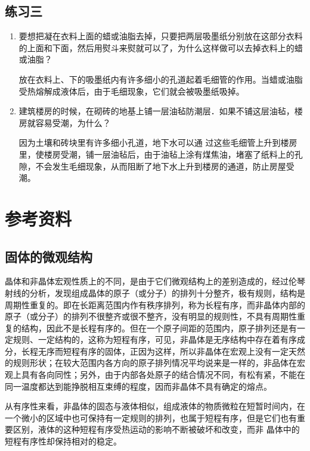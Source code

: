 \subsection{练习三}
\begin{enumerate}
   \item 要想把凝在衣料上面的蜡或油脂去掉，只要把两层吸墨纸分别放在这部分衣料的上面和下面，然后用熨斗来熨就可以了，为什么这样做可以去掉衣料上的蜡或油脂？

   \begin{solution}
    放在衣料上、下的吸墨纸内有许多细小的孔道起着毛细管的作用。当蜡或油脂受热熔解成液体后，由于毛细现象，它们就会被吸墨纸吸掉。
   \end{solution}
\item 建筑楼房的时候，在砌砖的地基上铺一层油毡防潮层．如果不铺这层油毡，楼房就容易受潮，为什么？

\begin{solution}
    因为土壤和砖块里有许多细小孔道，地下水可以通
    过这些毛细管上升到楼房里，使楼房受潮，铺一层油毡后，由于油毡上涂有煤焦油，堵塞了纸料上的孔隙，不会发生毛细现象，从而阻断了地下水上升到楼房的通道，防止房屋受潮。
\end{solution}
\end{enumerate}

\section{参考资料}
\subsection{固体的微观结构}

晶体和非晶体宏观性质上的不同，是由于它们微观结构上的差别造成的，经过伦琴射线的分析，发现组成晶体的原子（或分子）的排列十分整齐，极有规则，结构是周期性重复的。即在长距离范围内作有秩序排列，称为长程有序，而非晶体内部的原子（或分子）的排列不很整齐或很不整齐，没有明显的规则性，不具有周期性重复的结构，因此不是长程有序的。但在一个原子间距的范围内，原子排列还是有一定规则、一定结构的，这称为短程有序，可见，非晶体是无序结构中存在着有序成分，长程无序而短程有序的固体，正因为这样，所以非晶体在宏观上没有一定天然的规则形状；在较大范围内各方向的原子排列情况平均说来是一样的，非品体在宏观上具有各向同性；另外，由于内部各处原子的结合情况不同，有松有紧，不能在同一温度都达到能挣脱相互束缚的程度，因而非晶体不具有确定的熔点。

从有序性来看，非晶体的固态与液体相似，组成液体的物质微粒在短暂时间内，在一个微小的区域中也可保持有一定规则的排列，也属于短程有序，但是它们也有重要区别，液体的这种短程有序受热运动的影响不断被破坏和改变，而非
晶体中的短程有序性却保持相对的稳定。


